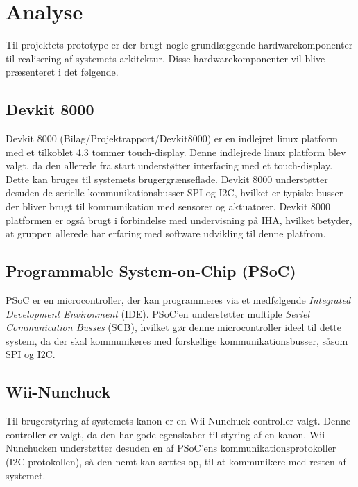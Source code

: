 \chapter{Analyse}
\label{afsnit:analyse}
Til projektets prototype er der brugt nogle grundlæggende hardwarekomponenter til realisering af systemets arkitektur. Disse hardwarekomponenter vil blive præsenteret i det følgende.

\section{Devkit 8000}
Devkit 8000 (Bilag/Projektrapport/Devkit8000) er en indlejret linux platform med et tilkoblet 4.3 tommer touch-display. Denne indlejrede linux platform blev valgt, da den allerede fra start understøtter interfacing med et touch-display. Dette kan bruges til systemets brugergrænseflade. Devkit 8000 understøtter desuden de serielle kommunikationsbusser SPI og I2C, hvilket er typiske busser der bliver brugt til kommunikation med sensorer og aktuatorer. \newline 
\noindent Devkit 8000 platformen er også brugt i forbindelse med undervisning på IHA, hvilket betyder, at gruppen allerede har erfaring med software udvikling til denne platfrom.

\section{Programmable System-on-Chip (PSoC)}
PSoC \cite{psoc} er en microcontroller, der kan programmeres via et medfølgende \textit{Integrated Development Environment} (IDE). PSoC'en understøtter multiple \textit{Seriel Communication Busses} (SCB), hvilket gør denne microcontroller ideel til dette system, da der skal kommunikeres med forskellige kommunikationsbusser, såsom SPI og I2C.

\section{Wii-Nunchuck}
Til brugerstyring af systemets kanon er en Wii-Nunchuck controller \cite{nunchuck} valgt. Denne controller er valgt, da den har gode egenskaber til styring af en kanon. Wii-Nunchucken understøtter desuden en af PSoC'ens kommunikationsprotokoller (I2C protokollen), så den nemt kan sættes op, til at kommunikere med resten af systemet.

